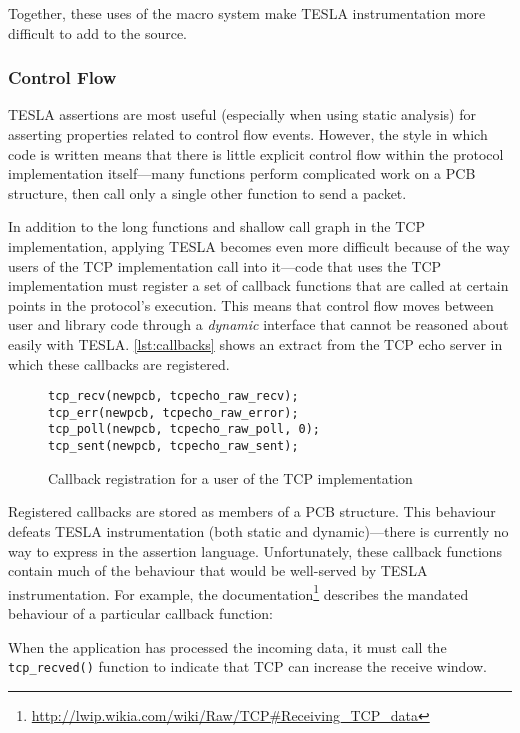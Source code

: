 Together, these uses of the macro system make TESLA instrumentation more difficult to add
to the \lwip{} source.

\subsubsection{Control Flow}

TESLA assertions are most useful (especially when using static analysis)
for asserting properties related to control flow events. However, the
style in which \lwip{} code is written means that there is little explicit
control flow within the protocol implementation itself---many functions
perform complicated work on a PCB structure, then call only a single
other function to send a packet.

In addition to the long functions and shallow call graph in the TCP
implementation, applying TESLA becomes even more difficult because of the way
users of the TCP implementation call into it---code that uses the TCP
implementation must register a set of callback functions that are called at
certain points in the protocol's execution. This means that control flow moves
between user and library code through a \emph{dynamic} interface that cannot be
reasoned about easily with TESLA. \autoref{lst:callbacks} shows an extract from the TCP
echo server in which these callbacks are registered.

\begin{figure}
  \begin{verbatim}
tcp_recv(newpcb, tcpecho_raw_recv);
tcp_err(newpcb, tcpecho_raw_error);
tcp_poll(newpcb, tcpecho_raw_poll, 0);
tcp_sent(newpcb, tcpecho_raw_sent);
  \end{verbatim}
  \caption{Callback registration for a user of the \lwip{} TCP implementation}
  \label{lst:callbacks}
\end{figure}

Registered callbacks are stored as members of a PCB structure. This
behaviour defeats TESLA instrumentation (both static and
dynamic)---there is currently no way to express  in the assertion language.
Unfortunately, these callback functions contain much of the behaviour
that would be well-served by TESLA instrumentation. For example, the
\lwip{}
documentation\footnote{\url{http://lwip.wikia.com/wiki/Raw/TCP\#Receiving_TCP_data}}
describes the mandated behaviour of a particular callback function:

\begin{displayquote}
When the application has processed the incoming data, it must call the
\texttt{tcp_recved()} function to indicate that TCP can increase
the receive window.
\end{displayquote}

